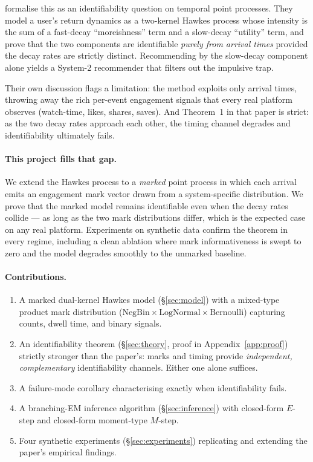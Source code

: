 \documentclass[11pt]{article}
\theoremstyle{remark}
\newcommand{\NegBin}{\mathrm{NegBin}}
\newcommand{\LogNormal}{\mathrm{LogNormal}}
\newcommand{\Bernoulli}{\mathrm{Bernoulli}}
\begin{document}
\citet{agarwal2024system2} formalise this as an identifiability question on temporal point processes. They model a user's return dynamics as a two-kernel Hawkes process whose intensity is the sum of a fast-decay ``moreishness'' term and a slow-decay ``utility'' term, and prove that the two components are identifiable \emph{purely from arrival times} provided the decay rates are strictly distinct. Recommending by the slow-decay component alone yields a System-2 recommender that filters out the impulsive trap.

Their own discussion flags a limitation: the method exploits only arrival times, throwing away the rich per-event engagement signals that every real platform observes (watch-time, likes, shares, saves). And Theorem~1 in that paper is strict: as the two decay rates approach each other, the timing channel degrades and identifiability ultimately fails.

\paragraph{This project fills that gap.} We extend the Hawkes process to a \emph{marked} point process in which each arrival emits an engagement mark vector drawn from a system-specific distribution. We prove that the marked model remains identifiable even when the decay rates collide --- as long as the two mark distributions differ, which is the expected case on any real platform. Experiments on synthetic data confirm the theorem in every regime, including a clean ablation where mark informativeness is swept to zero and the model degrades smoothly to the unmarked baseline.

\paragraph{Contributions.}
\begin{enumerate}[leftmargin=*,nosep]
\item A marked dual-kernel Hawkes model (\S\ref{sec:model}) with a mixed-type product mark distribution ($\NegBin \times \LogNormal \times \Bernoulli$) capturing counts, dwell time, and binary signals.
\item An identifiability theorem (\S\ref{sec:theory}, proof in Appendix~\ref{app:proof}) strictly stronger than the paper's: marks and timing provide \emph{independent, complementary} identifiability channels. Either one alone suffices.
\item A failure-mode corollary characterising exactly when identifiability fails.
\item A branching-EM inference algorithm (\S\ref{sec:inference}) with closed-form $E$-step and closed-form moment-type $M$-step.
\item Four synthetic experiments (\S\ref{sec:experiments}) replicating and extending the paper's empirical findings.
\end{enumerate}
\end{document}
